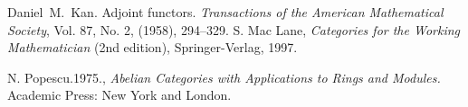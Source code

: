 \documentclass[12pt]{article}
\begin{document}
\begin{thebibliography}{9}
Daniel~M.~Kan. Adjoint functors.  {\it Transactions of the American Mathematical Society}, Vol. 87, No. 2, (1958), 294--329.
S. Mac Lane, \emph{Categories for the Working Mathematician} (2nd edition), Springer-Verlag, 1997.

N. Popescu.1975., \emph{Abelian Categories with Applications to Rings and Modules.}
Academic Press: New York and London.

\end{thebibliography}
\end{document}
